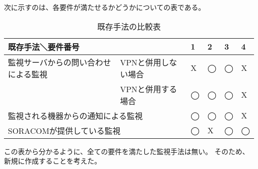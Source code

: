 	次に示すのは、各要件が満たせるかどうかについての表である。\\
	\begin{table}[htbp]
	\caption{既存手法の比較表}
	\begin{tabular}{|l|l|l|l|l|l|} \hline
		\multicolumn{2}{|l|}{既存手法＼要件番号} & 
		\multicolumn{1}{|l|}{1} &
		\multicolumn{1}{|l|}{2} &
		\multicolumn{1}{|l|}{3} &
		\multicolumn{1}{|l|}{4} \\ \hline \hline
		監視サーバからの問い合わせによる監視 & VPNと併用しない場合 & X & ◯ & ◯ & X  \\ \cline{2-6}
			& VPNと併用する場合 & ◯ & ◯ & ◯ & X \\ \hline
		\multicolumn{2}{|l|}{監視される機器からの通知による監視} & ◯ & ◯ & ◯ & X \\ \hline
		\multicolumn{2}{|l|}{SORACOMが提供している監視} & ◯ & X & ◯ & ◯ \\ \hline
	\end{tabular}
	\end{table}
	この表から分かるように、全ての要件を満たした監視手法は無い。
	そのため、新規に作成することを考えた。
\begin{comment}
	しかし、サーバーからの問い合わせによる監視では、IoT機器が接続するネットワークがプライベートアドレスであった場合に利用できず、
	監視対象機器からの通知による監視では、新たに機器監視サーバをたち上げなくてはならない。
	また、ネットワークの提供者による機器の監視サービスでは、提供ネットワークを利用した機器のリンクアップ・ダウンしか監視することが出来ず、
	VPNを利用した方法では、IoT機器が接続するネットワークのアドレス帯が多様であることから、難しい。
\end{comment}
	
	







